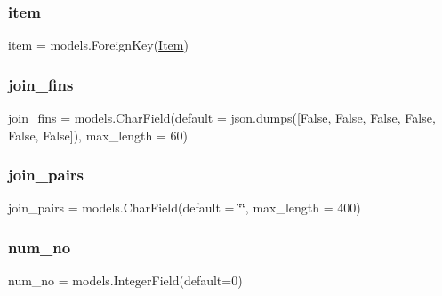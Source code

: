 \mbox{\label{classdynamicfilterapp_1_1models_1_1_i_p___pair_a4ed071da1d42b95e2465fb30952d9f80}} 
\subsubsection{\texorpdfstring{item}{item}}
{\footnotesize\ttfamily item = models.\+Foreign\+Key(\mbox{\hyperlink{classdynamicfilterapp_1_1models_1_1_item}{Item}})\hspace{0.3cm}{\ttfamily [static]}}

\mbox{\label{classdynamicfilterapp_1_1models_1_1_i_p___pair_a7e12dec29e5e01e8a9a2db5b2dc6bd71}} 
\subsubsection{\texorpdfstring{join\_fins}{join\_fins}}
{\footnotesize\ttfamily join\+\_\+fins = models.\+Char\+Field(default = json.\+dumps(\mbox{[}False, False, False, False, False, False\mbox{]}), max\+\_\+length = 60)\hspace{0.3cm}{\ttfamily [static]}}

\mbox{\label{classdynamicfilterapp_1_1models_1_1_i_p___pair_af9b68ef0f5d6fd8f26e308d47de43a88}} 
\subsubsection{\texorpdfstring{join\_pairs}{join\_pairs}}
{\footnotesize\ttfamily join\+\_\+pairs = models.\+Char\+Field(default = \char`\"{}\char`\"{}, max\+\_\+length = 400)\hspace{0.3cm}{\ttfamily [static]}}

\mbox{\label{classdynamicfilterapp_1_1models_1_1_i_p___pair_a1404efbdb930f496cf5b5db3b4725f4a}} 
\subsubsection{\texorpdfstring{num\_no}{num\_no}}
{\footnotesize\ttfamily num\+\_\+no = models.\+Integer\+Field(default=0)\hspace{0.3cm}{\ttfamily [static]}}

